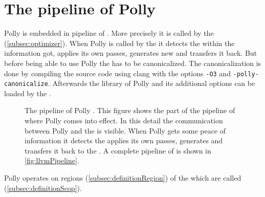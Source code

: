 \section{The pipeline of Polly}
Polly is embedded in pipeline of \llvm.
More precisely it is called by the \opt (\autoref{subsec:optimizer}).
When Polly is called by the \opt it detects the \scops within the information got, applies its own passes, generates new \llvmir and transfers it back.
But before being able to use Polly the \llvmir has to be canonicalized.
The canonicalization is done by compiling the source code using clang with the options \texttt{-O3} and \texttt{-polly-canonicalize}.
Afterwards the library of Polly and its additional options can be loaded by the \opt.
\begin{figure}[!ht]
    \caption[The pipeline of Polly]{
        The pipeline of Polly \cite{PollyPresentation}.
        This figure shows the part of the pipeline of \llvm where Polly comes into effect.
        In this detail the communication between Polly and the \opt is visible.
        When Polly gets some peace of information it detects the \scops applies its own passes, generates \llvmir and transfers it back to the \opt.
        A complete pipeline of \llvm is shown in \autoref{fig:llvmPipeline}.\tikzlegend
    }
    \centering
\end{figure}
Polly operates on regions (\autoref{subsec:definitionRegion}) of the \cfg which are called \scops (\autoref{subsec:definitionScop}).
